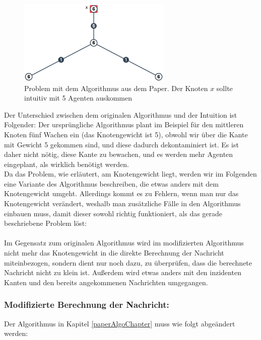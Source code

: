 		\begin{figure}[htb]
			\includegraphics[width=0.65\textwidth]{bilder/abb_paper_problem.png}
			\captionsetup{width=0.65\textwidth}
			\caption{Problem mit dem Algorithmus aus dem Paper. Der Knoten $x$ sollte intuitiv mit 5 Agenten auskommen}
			\label{fig:negBeispielPaperAlgo}
		\end{figure}

Der Unterschied zwischen dem originalen Algorithmus und der Intuition ist Folgender: Der ursprüngliche Algorithmus plant im Beispiel für den mittleren Knoten fünf Wachen ein (das Knotengewicht ist 5), obwohl wir über die Kante mit Gewicht 5 gekommen sind, und diese dadurch dekontaminiert ist. Es ist daher nicht nötig, diese Kante zu bewachen, und es werden mehr Agenten eingeplant, als wirklich benötigt werden.
\\
Da das Problem, wie erläutert, am Knotengewicht liegt, werden wir im Folgenden eine Variante des Algorithmus beschreiben, die etwas anders mit dem Knotengewicht umgeht. Allerdings kommt es zu Fehlern, wenn man nur das Knotengewicht verändert, weshalb man zusätzliche Fälle in den Algorithmus einbauen muss, damit dieser sowohl richtig funktioniert, als das gerade beschriebene Problem löst:
\\
\\
Im Gegensatz zum originalen Algorithmus wird im modifizierten Algorithmus nicht mehr das Knotengewicht in die direkte Berechnung der Nachricht miteinbezogen, sondern dient nur noch dazu, zu überprüfen, dass die berechnete Nachricht nicht zu klein ist. Außerdem wird etwas anders mit den inzidenten Kanten und den bereits angekommenen Nachrichten umgegangen.

\subsubsection{Modifizierte Berechnung der Nachricht:}

Der Algorithmus in Kapitel \ref{paperAlgoChapter} muss wie folgt abgeändert werden:

